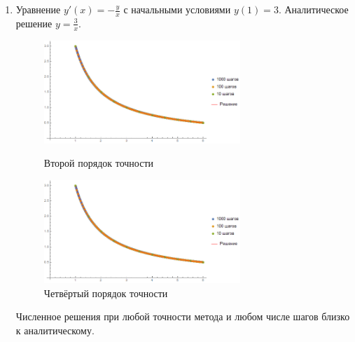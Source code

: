 \documentclass[a4paper,12pt,titlepage,finall]{article}
\begin{document}
\begin{enumerate}
\item
Уравнение $y'(x) = -\frac{y}{x}$ с начальными условиями $y(1)=3$. Аналитическое решение $y = \frac{3}{x}$.
\begin{figure}[h]
\centering
\includegraphics[width=0.7\textwidth]{test_1_1_2.png}
\caption{Второй порядок точности}
\centering
\includegraphics[width=0.7\textwidth]{test_1_1_4.png}
\caption{Четвёртый порядок точности}
\end{figure}
\par
Численное решения при любой точности метода и любом числе шагов близко к аналитическому.


\end{enumerate}
\end{document}

